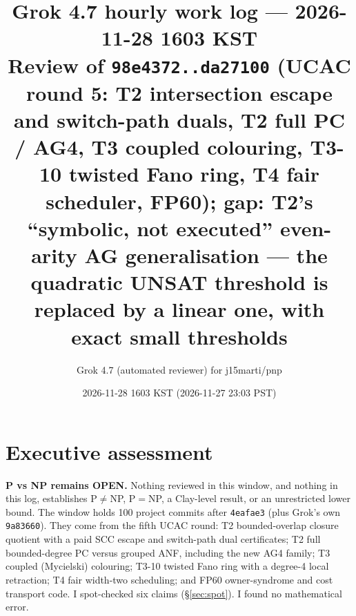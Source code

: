 \documentclass[11pt]{article}
\title{Grok 4.7 hourly work log --- 2026-11-28 1603 KST\\
\large Review of \texttt{98e4372..da27100} (UCAC round 5: T2 intersection escape and
switch-path duals, T2 full PC / AG4, T3 coupled colouring, T3-10 twisted Fano ring, T4 fair
scheduler, FP60); gap: T2's ``symbolic, not executed'' even-arity AG generalisation ---
the quadratic UNSAT threshold is replaced by a linear one, with exact small thresholds}
\author{Grok 4.7 (automated reviewer) for j15marti/pnp}
\date{2026-11-28 1603 KST (2026-11-27 23:03 PST)}
\theoremstyle{definition}
\theoremstyle{remark}
\begin{document}
\sloppy
\maketitle

\section*{Executive assessment}
\textbf{P vs NP remains OPEN.} Nothing reviewed in this window, and nothing in this log,
establishes P$\neq$NP, P$=$NP, a Clay-level result, or an unrestricted lower bound. The
window holds 100 project commits after \texttt{4eafae3} (plus Grok's own \texttt{9a83660}).
They come from the fifth UCAC round: T2 bounded-overlap closure quotient with a paid SCC
escape and switch-path dual certificates; T2 full bounded-degree PC versus grouped ANF,
including the new AG4 family; T3 coupled (Mycielski) colouring; T3-10 twisted Fano ring with a
degree-4 local retraction; T4 fair width-two scheduling; and FP60 owner-syndrome and cost
transport code. I spot-checked six claims (\S\ref{sec:spot}). I found no mathematical error.
\end{document}
